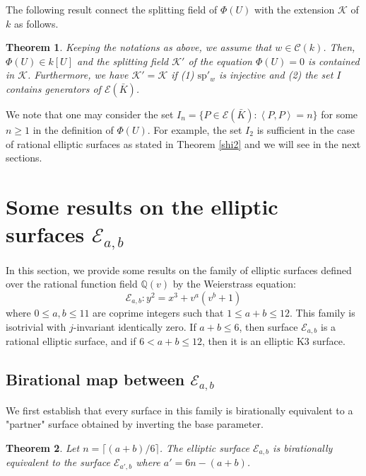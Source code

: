 \documentclass[11pt]{amsart}
\newcommand{\Kb}{{{\bar K}}}
\newcommand{\Q}{{\mathbb Q}}
\newcommand{\Cc}{{\mathcal C}}
\newcommand{\Ee}{{\mathcal E}}
\newcommand{\KK}{{\mathcal K}}
\newtheorem{thm}{Theorem}[section]
\numberwithin{equation}{section}
\numberwithin{table}{section}
\newcommand\<{\langle}
\begin{document}
The following result connect the splitting field of $\Phi(U)$ with the extension $\KK$ of $k$ as follows.
\begin{thm}
	\label{phi}
	Keeping the notations as above, we assume that $w\in \Cc(k)$. Then,   $\Phi(U)\in k[U]$ and 
	the splitting field $\KK'$ of the equation $\Phi(U)=0$ is contained in $\KK$. Furthermore, we have $\KK'=\KK$ if 
	(1)  $\text{sp}'_w$ is injective and (2) the set $I$ contains generators of $\Ee(\Kb)$.
\end{thm}
We note that  one may consider the set 
$I_n=\{P\in \Ee(\Kb):  \left\langle P,  P\right\rangle =n\}$ for some $n\geq 1$ in the definition of $\Phi(U)$.
For example,  the set $I_2$ is sufficient in the case of rational elliptic surfaces as stated in Theorem \eqref{shi2} and we will see in the next sections.
\fi


\section{Some results on the elliptic surfaces $\Ee_{a,b}$}
\label{Eab}
In this section, we provide some results on the family of elliptic surfaces defined over the rational function field $\Q(v)$ by the Weierstrass equation:
\begin{equation} \label{eq:main}
	\Ee_{a,b}: y^2 = x^3 + v^a(v^b+1)
\end{equation}
where $0 \leq a, b\leq 11$ are  coprime integers such that  $1   \leq a+b \leq 12$. This family is isotrivial with $j$-invariant identically zero.
If $a+b \leq 6$, then  surface  $\Ee_{a,b}$ is a rational elliptic surface, and if
 $6 < a+b \leq 12$, then it is an elliptic K3 surface.


 
\subsection{Birational map between $\Ee_{a,b}$}

We first establish that every surface in this family is birationally equivalent to a "partner" surface obtained by inverting the base parameter.

\begin{thm} 
	\label{thm:birational}
	Let $n = \lceil (a+b)/6 \rceil$. The elliptic surface $\Ee_{a,b}$ is birationally equivalent to the surface $\Ee_{a', b}$ where $a' = 6n - (a+b)$.
\end{thm}
\end{document}
